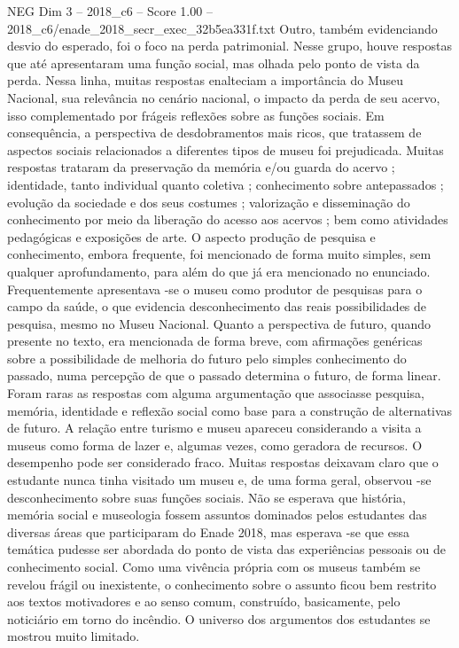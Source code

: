 \begin{textsample}{NEG Dim 3 – 2018\_c6 – Score 1.00 – 2018\_c6/enade\_2018\_secr\_exec\_32b5ea331f.txt}
Outro, também evidenciando desvio do esperado, foi o foco na perda patrimonial.
Nesse grupo, houve respostas que até apresentaram uma função social, mas olhada pelo ponto de vista da perda.
Nessa linha, muitas respostas enalteciam a importância do Museu Nacional, sua relevância no cenário nacional, o impacto da perda de seu acervo, isso complementado por frágeis reflexões sobre as funções sociais.
Em consequência, a perspectiva de desdobramentos mais ricos, que tratassem de aspectos sociais relacionados a diferentes tipos de museu foi prejudicada.
Muitas respostas trataram da preservação da memória e/ou guarda do acervo ; identidade, tanto individual quanto coletiva ; conhecimento sobre antepassados ; evolução da sociedade e dos seus costumes ; valorização e disseminação do conhecimento por meio da liberação do acesso aos acervos ; bem como atividades pedagógicas e exposições de arte.
O aspecto produção de pesquisa e conhecimento, embora frequente, foi mencionado de forma muito simples, sem qualquer aprofundamento, para além do que já era mencionado no enunciado.
Frequentemente apresentava -se o museu como produtor de pesquisas para o campo da saúde, o que evidencia desconhecimento das reais possibilidades de pesquisa, mesmo no Museu Nacional.
Quanto a perspectiva de futuro, quando presente no texto, era mencionada de forma breve, com afirmações genéricas sobre a possibilidade de melhoria do futuro pelo simples conhecimento do passado, numa percepção de que o passado determina o futuro, de forma linear.
Foram raras as respostas com alguma argumentação que associasse pesquisa, memória, identidade e reflexão social como base para a construção de alternativas de futuro.
A relação entre turismo e museu apareceu considerando a visita a museus como forma de lazer e, algumas vezes, como geradora de recursos.
O desempenho pode ser considerado fraco.
Muitas respostas deixavam claro que o estudante nunca tinha visitado um museu e, de uma forma geral, observou -se desconhecimento sobre suas funções sociais.
Não se esperava que história, memória social e museologia fossem assuntos dominados pelos estudantes das diversas áreas que participaram do Enade 2018, mas esperava -se que essa temática pudesse ser abordada do ponto de vista das experiências pessoais ou de conhecimento social.
Como uma vivência própria com os museus também se revelou frágil ou inexistente, o conhecimento sobre o assunto ficou bem restrito aos textos motivadores e ao senso comum, construído, basicamente, pelo noticiário em torno do incêndio.
O universo dos argumentos dos estudantes se mostrou muito limitado.

\end{textsample}
